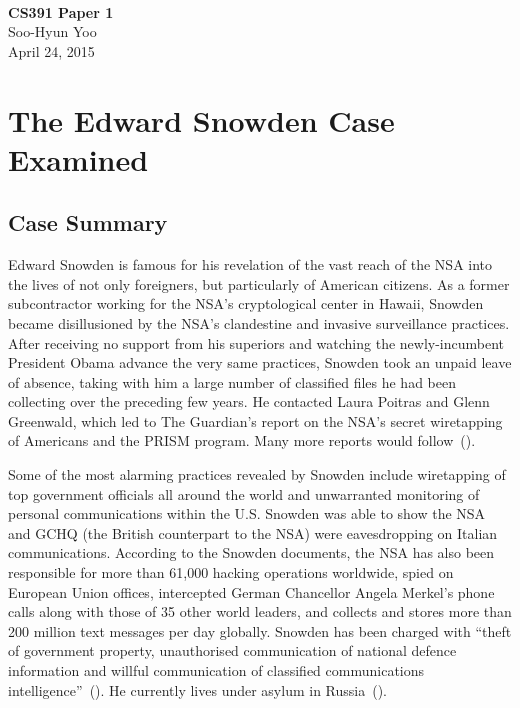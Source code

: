 \documentclass[12pt,letterpaper]{article}
\renewcommand{\citep}[1]{(\cite{#1})}
\begin{document}
\fancyfoot{}
\begin{center}
    \hfill \\
    \vspace{4in}
    {\bf\Huge CS391 Paper 1 \\}
    \vspace{2in}
    {\Large Soo-Hyun Yoo \\ April 24, 2015}
\end{center}

\newpage
{}

\section*{The Edward Snowden Case Examined}

\subsection*{Case Summary}

Edward Snowden is famous for his revelation of the vast reach of the NSA into
the lives of not only foreigners, but particularly of American citizens. As
a former subcontractor working for the NSA's cryptological center in Hawaii,
Snowden became disillusioned by the NSA's clandestine and invasive surveillance
practices. After receiving no support from his superiors and watching the
newly-incumbent President Obama advance the very same practices, Snowden took
an unpaid leave of absence, taking with him a large number of classified files
he had been collecting over the preceding few years. He contacted Laura Poitras
and Glenn Greenwald, which led to The Guardian's report on the NSA's secret
wiretapping of Americans and the PRISM program. Many more reports would
follow~\citep{harding2014}.

Some of the most alarming practices revealed by Snowden include wiretapping of
top government officials all around the world and unwarranted monitoring of
personal communications within the U.S. Snowden was able to show the NSA and
GCHQ (the British counterpart to the NSA) were eavesdropping on Italian
communications. According to the Snowden documents, the NSA has also been
responsible for more than 61,000 hacking operations worldwide, spied on
European Union offices, intercepted German Chancellor Angela Merkel's phone
calls along with those of 35 other world leaders, and collects and stores more
than 200 million text messages per day globally. Snowden has been charged with
``theft of government property, unauthorised communication of national defence
information and willful communication of classified communications
intelligence''~\citep{bbc2014}. He currently lives under asylum in
Russia~\citep{rusbridger2014}.
\end{document}
